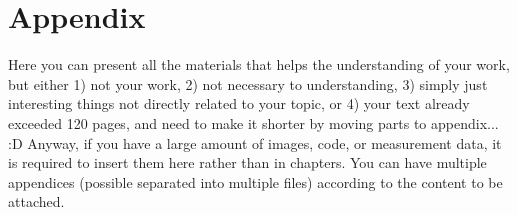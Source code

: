 \chapter{Appendix}

Here you can present all the materials that helps the understanding of your work, but either 1) not your work, 2) not necessary to understanding, 3) simply just interesting things not directly related to your topic, or 4) your text already exceeded 120 pages, and need to make it shorter by moving parts to appendix... :D Anyway, if you have a large amount of images, code, or measurement data, it is required to insert them here rather than in chapters. You can have multiple appendices (possible separated into multiple files) according to the content to be attached.
